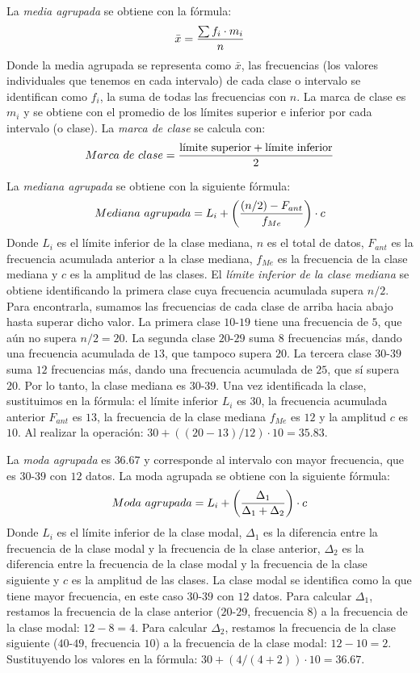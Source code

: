 \documentclass[12pt]{article}
\begin{document}
La \textit{media agrupada} se obtiene con la fórmula:
\[\bar{x} = {{\sum{f_i \cdot m_i}} \over n}\]
Donde la media agrupada se representa como $\bar{x}$, las frecuencias (los valores individuales que tenemos en cada intervalo) de cada clase o intervalo se identifican como $f_i$, la suma de todas las frecuencias con $n$. La marca de clase es $m_i$ y se obtiene con el promedio de los límites superior e inferior por cada intervalo (o clase). La \textit{marca de clase} se calcula con:
\[Marca\ de\ clase = {{\text{límite superior} + \text{límite inferior}} \over 2}\]

La \textit{mediana agrupada} se obtiene con la siguiente fórmula:
\[Mediana\ agrupada = L_i + \left({{(n/2) - F_{ant}} \over f_{Me}}\right) \cdot c\]
Donde $L_i$ es el límite inferior de la clase mediana, $n$ es el total de datos, $F_{ant}$ es la frecuencia acumulada anterior a la clase mediana, $f_{Me}$ es la frecuencia de la clase mediana y $c$ es la amplitud de las clases. El \textit{límite inferior de la clase mediana} se obtiene identificando la primera clase cuya frecuencia acumulada supera $n/2$. Para encontrarla, sumamos las frecuencias de cada clase de arriba hacia abajo hasta superar dicho valor. La primera clase $10\text{-}19$ tiene una frecuencia de $5$, que aún no supera $n/2 = 20$. La segunda clase $20\text{-}29$ suma $8$ frecuencias más, dando una frecuencia acumulada de $13$, que tampoco supera $20$. La tercera clase $30\text{-}39$ suma $12$ frecuencias más, dando una frecuencia acumulada de $25$, que sí supera $20$. Por lo tanto, la clase mediana es $30\text{-}39$. Una vez identificada la clase, sustituimos en la fórmula: el límite inferior $L_i$ es $30$, la frecuencia acumulada anterior $F_{ant}$ es $13$, la frecuencia de la clase mediana $f_{Me}$ es $12$ y la amplitud $c$ es $10$. Al realizar la operación: $30 + ((20 - 13)/12) \cdot 10 = 35.83$.

La \textit{moda agrupada} es $36.67$ y corresponde al intervalo con mayor frecuencia, que es $30\text{-}39$ con $12$ datos. La moda agrupada se obtiene con la siguiente fórmula:
\[Moda\ agrupada = L_i + \left({\Delta_1 \over \Delta_1 + \Delta_2}\right) \cdot c\]
Donde $L_i$ es el límite inferior de la clase modal, $\Delta_1$ es la diferencia entre la frecuencia de la clase modal y la frecuencia de la clase anterior, $\Delta_2$ es la diferencia entre la frecuencia de la clase modal y la frecuencia de la clase siguiente y $c$ es la amplitud de las clases. La clase modal se identifica como la que tiene mayor frecuencia, en este caso $30\text{-}39$ con $12$ datos. Para calcular $\Delta_1$, restamos la frecuencia de la clase anterior ($20\text{-}29$, frecuencia $8$) a la frecuencia de la clase modal: $12 - 8 = 4$. Para calcular $\Delta_2$, restamos la frecuencia de la clase siguiente ($40\text{-}49$, frecuencia $10$) a la frecuencia de la clase modal: $12 - 10 = 2$. Sustituyendo los valores en la fórmula: $30 + (4/(4+2)) \cdot 10 = 36.67$.
\end{document}
